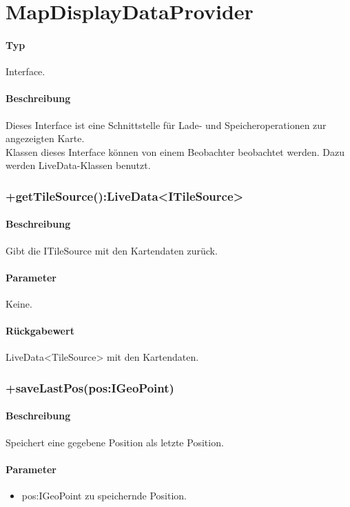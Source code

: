 \section{MapDisplayDataProvider}
\paragraph*{Typ}
Interface.
\paragraph*{Beschreibung}
Dieses Interface ist eine Schnittstelle für Lade- und Speicheroperationen zur angezeigten Karte.\\
Klassen dieses Interface können von einem Beobachter beobachtet werden. Dazu werden 
LiveData-Klassen benutzt.

\subsubsection{+getTileSource():LiveData<ITileSource>}%
\paragraph*{Beschreibung}
Gibt die ITileSource mit den Kartendaten zurück.
\paragraph*{Parameter}
Keine.
\paragraph*{Rückgabewert}
LiveData<TileSource> mit den Kartendaten.

\subsubsection{+saveLastPos(pos:IGeoPoint)}%
\paragraph*{Beschreibung}
Speichert eine gegebene Position als letzte Position.
\paragraph*{Parameter}
\begin{itemize}
    \item pos:IGeoPoint zu speichernde Position.
\end{itemize}
